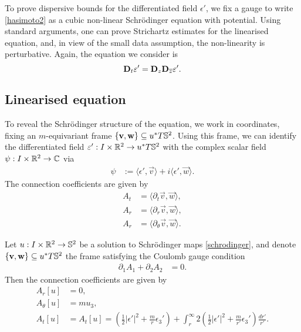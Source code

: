 
To prove dispersive bounds for the differentiated field $\epsilon'$, we fix a gauge to write \eqref{hasimoto2} as a cubic non-linear Schr\"odinger equation with potential. Using standard arguments, one can prove Strichartz estimates for the linearised equation, and, in view of the small data assumption, the non-linearity is perturbative. Again, the equation we consider is 
    \begin{equation}\label{eq:hasimotodisp}
        {\bf D}_t \varepsilon' 
            = {\bf D}_z {\bf D}_{\overline z} \varepsilon'. 
    \end{equation}

\subsection{Linearised equation}

To reveal the Schr\"odinger structure of the equation, we work in coordinates, fixing an $m$-equivariant frame $\{\mathbf v, \mathbf w\} \subseteq u^* T\mathbb S^2$. Using this frame, we can identify the differentiated field $\varepsilon' : I \times \mathbb R^2 \to u^* T\mathbb S^2$ with the complex scalar field $\psi: I \times \mathbb R^2 \to \mathbb C$ via 
    \begin{align*}
        \psi 
            &:= \big\langle \epsilon', \vec v \big\rangle + i \big\langle \epsilon', \vec w \rangle.
    \end{align*}
The connection coefficients are given by
    \begin{align*}
        A_t 
            &= \big\langle \partial_t \vec v, \vec w \big\rangle, \\
        A_r 
            &= \big\langle \partial_r \vec v, \vec w \big\rangle, \\
        A_r 
            &= \big\langle \partial_\theta \vec v, \vec w \big\rangle.
    \end{align*}



\begin{proposition}
    Let $u : I \times \mathbb R^2 \to \mathbb S^2$ be a solution to Schr\"odinger maps \eqref{schrodinger}, and denote $\{\mathbf v, \mathbf w\} \subseteq u^* T\mathbb S^2$ the frame satisfying the Coulomb gauge condition 
        \begin{equation}
            \begin{split}
                \partial_1 A_1 + \partial_2 A_ 2 
                    &= 0.
            \end{split}
        \end{equation}
    Then the connection coefficients are given by  
        \begin{align}
            A_r [u] 
                &= 0,\\
            A_\theta [u]
                &= m u_3,\\
            A_t [u]
                &=A_t [u] 
                = \left( \frac12|\epsilon'|^2 + \frac{m}{r} \epsilon_3'\right) + \int_r^\infty 2 \left( \frac12|\epsilon'|^2 + \frac{m}{r'} \epsilon_3' \right) \frac{dr'}{r'}.
        \end{align}
\end{proposition}

